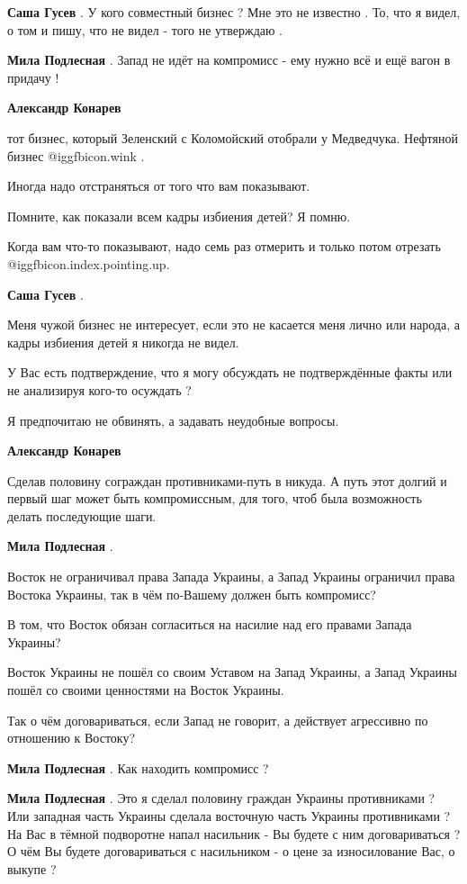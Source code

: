 \begin{itemize}
\begin{itemize}
\textbf{Саша Гусев} .
У кого совместный бизнес ?
Мне это не известно .
То, что я видел, о том и пишу, что не видел - того не утверждаю .

\textbf{Мила Подлесная} .
Запад не идёт на компромисс - ему нужно всё и ещё вагон в придачу !

\textbf{Александр Конарев} 

тот бизнес, который Зеленский с Коломойский отобрали у Медведчука. Нефтяной
бизнес  @igg{fbicon.wink} .

Иногда надо отстраняться от того что вам показывают.

Помните, как показали всем кадры избиения детей? Я помню.

Когда вам что-то показывают, надо семь раз отмерить и только потом отрезать
@igg{fbicon.index.pointing.up}.

\textbf{Саша Гусев} .

Меня чужой бизнес не интересует, если это не касается меня лично или народа, а
кадры избиения детей я никогда не видел.

У Вас есть подтверждение, что я могу обсуждать не подтверждённые факты или не
анализируя кого-то осуждать ?

Я предпочитаю не обвинять, а задавать неудобные вопросы.

\textbf{Александр Конарев} 

Сделав половину сограждан противниками-путь в никуда. А путь этот долгий и
первый шаг может быть компромиссным, для того, чтоб была возможность делать
последующие шаги.

\textbf{Мила Подлесная} .

Восток не ограничивал права Запада Украины, а Запад Украины ограничил права
Востока Украины, так в чём по-Вашему должен быть компромисс?

В том, что Восток обязан согласиться на насилие над его правами Запада Украины?

Восток Украины не пошёл со своим Уставом на Запад Украины, а Запад Украины
пошёл со своими ценностями на Восток Украины.

Так о чём договариваться, если Запад не говорит, а действует агрессивно по
отношению к Востоку?


\textbf{Мила Подлесная} .
Как находить компромисс ?

\textbf{Мила Подлесная} .
Это я сделал половину граждан Украины противниками ?
Или западная часть Украины сделала восточную часть Украины противниками ?
На Вас в тёмной подворотне напал насильник - Вы будете с ним договариваться ?
О чём Вы будете договариваться с насильником - о цене за износилование Вас, о выкупе ?


\end{itemize}
\end{itemize}

